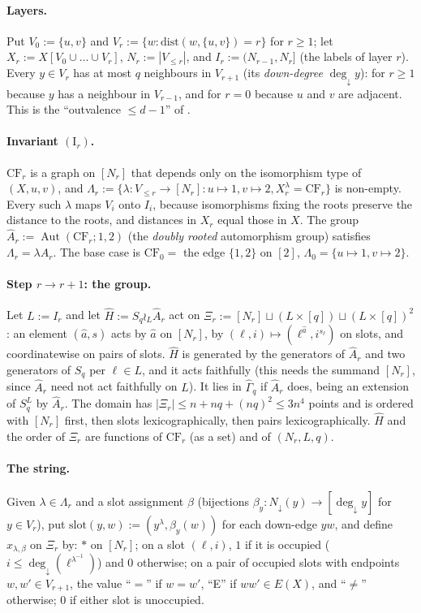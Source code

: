 \documentclass[11pt]{article}
\theoremstyle{plain}
\theoremstyle{definition}
\theoremstyle{remark}
\theoremstyle{named}
\theoremstyle{namedrm}
\newcommand{\Aut}{\operatorname{Aut}}
\newcommand{\Gq}[1]{\widehat{\Gamma}_{#1}}
\begin{document}
\paragraph{Layers.} Put $V_0:=\{u,v\}$ and $V_r:=\{w:\mathrm{dist}(w,\{u,v\})=r\}$ for $r\ge1$; let
$X_r:=X[V_0\cup\dots\cup V_r]$, $N_r:=|V_{\le r}|$, and $I_r:=(N_{r-1},N_r]$ (the labels of layer $r$). Every
$y\in V_r$ has at most $q$ neighbours in $V_{r+1}$ (its \emph{down-degree} $\deg_\downarrow y$): for $r\ge1$
because $y$ has a neighbour in $V_{r-1}$, and for $r=0$ because $u$ and $v$ are adjacent. This is the
``outvalence $\le d-1$'' of \cite[Lemma~4.4]{BL83}.

\paragraph{Invariant $(\mathrm I_r)$.} $\mathrm{CF}_r$ is a graph on $[N_r]$ that depends only on the isomorphism
type of $(X,u,v)$, and $\Lambda_r:=\{\lambda\colon V_{\le r}\to[N_r]:u\mapsto1,v\mapsto2,X_r^\lambda=\mathrm{CF}_r\}$ is
non-empty. Every such $\lambda$ maps $V_i$ onto $I_i$, because isomorphisms fixing the roots preserve the
distance to the roots, and distances in $X_r$ equal those in $X$. The group
$\hat A_r:=\Aut(\mathrm{CF}_r;1,2)$ (the \emph{doubly rooted} automorphism group) satisfies
$\Lambda_r=\lambda\hat A_r$. The base case is $\mathrm{CF}_0=$ the edge $\{1,2\}$ on $[2]$, $\Lambda_0=\{u\mapsto1,v\mapsto2\}$.

\paragraph{Step $r\to r+1$: the group.} Let $L:=I_r$ and let $\hat H:=S_q\wr_L\hat A_r$ act on
$\Xi_r:=[N_r]\sqcup(L\times[q])\sqcup(L\times[q])^2$: an element $(\hat a,s)$ acts by $\hat a$ on $[N_r]$, by
$(\ell,i)\mapsto(\ell^{\hat a},i^{s_\ell})$ on slots, and coordinatewise on pairs of slots. $\hat H$ is generated
by the generators of $\hat A_r$ and two generators of $S_q$ per $\ell\in L$, and it acts faithfully (this needs
the summand $[N_r]$, since $\hat A_r$ need not act faithfully on $L$). It lies in $\Gq{q}$ if $\hat A_r$ does,
being an extension of $S_q^L$ by $\hat A_r$. The domain has $|\Xi_r|\le n+nq+(nq)^2\le3n^4$ points and is ordered
with $[N_r]$ first, then slots lexicographically, then pairs lexicographically. $\hat H$ and the order of
$\Xi_r$ are functions of $\mathrm{CF}_r$ (as a set) and of $(N_r,L,q)$.

\paragraph{The string.} Given $\lambda\in\Lambda_r$ and a slot assignment $\beta$ (bijections
$\beta_y\colon N_\downarrow(y)\to[\deg_\downarrow y]$ for $y\in V_r$), put $\mathrm{slot}(y,w):=(y^\lambda,\beta_y(w))$ for each
down-edge $yw$, and define $x_{\lambda,\beta}$ on $\Xi_r$ by: $*$ on $[N_r]$; on a slot $(\ell,i)$, $1$ if it is
occupied ($i\le\deg_\downarrow(\ell^{\lambda^{-1}})$) and $0$ otherwise; on a pair of occupied slots with endpoints
$w,w'\in V_{r+1}$, the value ``$=$'' if $w=w'$, ``E'' if $ww'\in E(X)$, and ``$\ne$'' otherwise; $0$ if either
slot is unoccupied.
\end{document}
